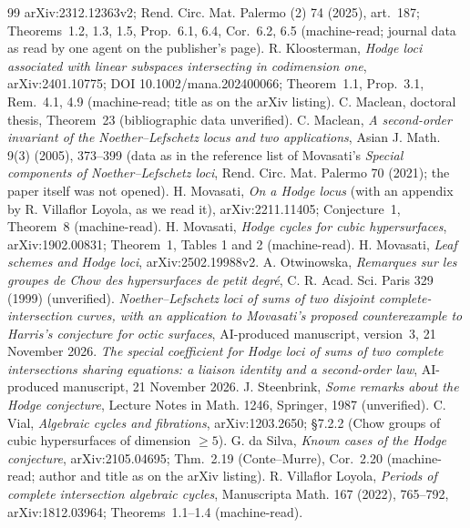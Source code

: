 \documentclass[10pt]{article}
\numberwithin{equation}{section}
\theoremstyle{remark}
\begin{document}
\begin{thebibliography}{99}
arXiv:2312.12363v2; Rend. Circ. Mat. Palermo (2) 74 (2025), art.~187; Theorems~1.2, 1.3, 1.5, Prop.~6.1, 6.4,
Cor.~6.2, 6.5 (machine-read; journal data as read by one agent on the publisher's page).
 R. Kloosterman, \emph{Hodge loci associated with linear subspaces intersecting in codimension one},
arXiv:2401.10775; DOI 10.1002/mana.202400066; Theorem~1.1, Prop.~3.1, Rem.~4.1, 4.9 (machine-read; title as on the
arXiv listing).
 C. Maclean, doctoral thesis, Theorem~23 (bibliographic data unverified).
 C. Maclean, \emph{A second-order invariant of the Noether--Lefschetz locus and two applications},
Asian J. Math. 9(3) (2005), 373--399 (data as in the reference list of Movasati's \emph{Special components of
Noether--Lefschetz loci}, Rend. Circ. Mat. Palermo 70 (2021); the paper itself was not opened).
 H. Movasati, \emph{On a Hodge locus} (with an appendix by R. Villaflor Loyola, as we read it),
arXiv:2211.11405; Conjecture~1, Theorem~8 (machine-read).
 H. Movasati, \emph{Hodge cycles for cubic hypersurfaces}, arXiv:1902.00831; Theorem~1, Tables 1
and 2 (machine-read).
 H. Movasati, \emph{Leaf schemes and Hodge loci}, arXiv:2502.19988v2.
 A. Otwinowska, \emph{Remarques sur les groupes de Chow des hypersurfaces de petit degr\'e},
C. R. Acad. Sci. Paris 329 (1999) (unverified).
 \emph{Noether--Lefschetz loci of sums of two disjoint complete-intersection curves, with an application
to Movasati's proposed counterexample to Harris's conjecture for octic surfaces}, AI-produced manuscript, version~3,
21 November 2026.
 \emph{The special coefficient for Hodge loci of sums of two complete intersections sharing
equations: a liaison identity and a second-order law}, AI-produced manuscript, 21 November 2026.
 J. Steenbrink, \emph{Some remarks about the Hodge conjecture}, Lecture Notes in Math. 1246, Springer,
1987 (unverified).
 C. Vial, \emph{Algebraic cycles and fibrations}, arXiv:1203.2650; \S 7.2.2 (Chow groups of cubic hypersurfaces of dimension
$\ge5$).
 G. da Silva, \emph{Known cases of the Hodge conjecture}, arXiv:2105.04695; Thm.~2.19
(Conte--Murre), Cor.~2.20 (machine-read; author and title as on the arXiv listing).
 R. Villaflor Loyola, \emph{Periods of complete intersection algebraic cycles}, Manuscripta Math. 167
(2022), 765--792, arXiv:1812.03964; Theorems~1.1--1.4 (machine-read).
\end{thebibliography}
\end{document}
